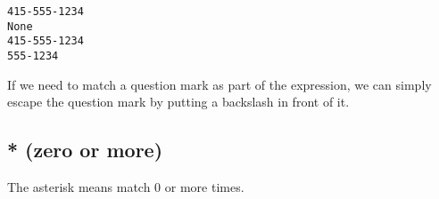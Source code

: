 \documentclass[11pt]{article}
\begin{document}
\begin{verbatim}
415-555-1234
None
415-555-1234
555-1234
\end{verbatim}


If we need to match a question mark as part of the expression, we can simply escape the question mark by putting a backslash in front of it.

\subsection{* (zero or more)}
\label{sec:org133cc89}

The asterisk means match 0 or more times.
\end{document}
